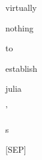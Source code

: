 \documentclass[varwidth=150mm]{standalone}
\begin{document}
\begin{CJK*}{UTF8}{gbsn}
{{{\colorbox{red!0.0}{\strut virtually} \colorbox{red!3.538832664489746}{\strut nothing} \colorbox{red!0.0}{\strut to} \colorbox{red!1.26529860496521}{\strut establish} \colorbox{red!7.528243541717529}{\strut julia} \colorbox{red!1.2761187553405762}{\strut '} \colorbox{red!2.158658981323242}{\strut s} \colorbox{red!4.1006669998168945}{\strut [SEP]}
}}}
\end{CJK*}
\end{document}
